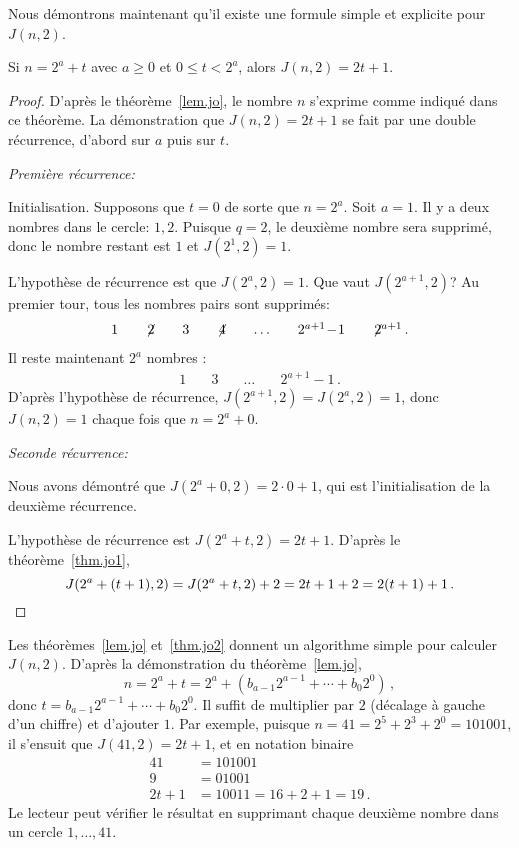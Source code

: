Nous démontrons maintenant qu'il existe une formule simple  et explicite pour $J(n,2)$. 
\begin{theorem}\label{thm.jo2}
Si $n=2^a+t$ avec $a\geq 0$ et $0\leq t < 2^a$, alors $J(n,2)=2t+1$.
\end{theorem}

\begin{proof}
D'après le théorème~\ref{lem.jo}, 
 le nombre $n$ s'exprime comme indiqué dans ce théorème. La démonstration que $J(n,2)=2t+1$ se fait par une double récurrence, d'abord sur $a$ puis sur $t$.

\textit{Première récurrence:}

Initialisation. Supposons que $t=0$ de sorte que $n=2^a$. Soit $a=1$.  Il y a deux nombres dans le cercle: $1,2$. Puisque $q=2$, le deuxième nombre sera supprimé, donc le nombre restant est $1$ et $J(2^1,2)=1$.

L'hypothèse de récurrence est que $J(2^a,2)=1$. Que vaut $J(2^{a+1},2)$? Au premier tour, tous les nombres pairs sont supprimés:
\[
\begin{array}{rrrrrrrrrrrrrrrrrrrrrrrrrrrr}
1&\quad\not\! 2&\quad3&\quad\not\! 4& \quad\ldots&\quad 2^{a+1}\!-\!1&\quad \not\! 2^{a+1}\,.
\end{array}
\]
Il reste maintenant $2^a$ nombres :
\[
\begin{array}{rrrrrrrrrrrrrrrrrrrrrrrrrrrr}
1&\quad3&\quad\ldots&\quad 2^{a+1}\!-\!1\,.
\end{array}
\]
D'après l'hypothèse de récurrence, $J(2^{a+1},2)=J(2^a,2)=1$, donc  $J(n,2)=1$ chaque fois que $n=2^a+0$.

\textit{Seconde récurrence:}

Nous avons démontré que $J(2^a+0,2)=2\cdot 0 +1$, qui est l'initialisation de la deuxième récurrence.

L'hypothèse de récurrence est $J(2^a+t,2)=2t+1$. D'après le théorème~\ref{thm.jo1},
\[
J(2^a+(t+1),2)=J(2^a+t,2)+2=2t+1+2=2(t+1)+1\,.
\qedhere\]
\end{proof}


Les théorèmes~\ref{lem.jo} et~\ref{thm.jo2} donnent un algorithme simple pour calculer $J(n,2)$. D'après la démonstration du théorème~\ref{lem.jo},
\[
n=2^a+t=2^a+(b_{a-1}2^{a-1}+\cdots+b_{0}2^{0})\,,
\]
donc $t=b_{a-1}2^{a-1}+\cdots+b_{0}2^{0}$. Il suffit de multiplier par $2$ (décalage à gauche d'un chiffre) et d'ajouter $1$. Par exemple, puisque $n=41=2^5+2^3+2^0=101001$, il s'ensuit que $J(41,2)=2t+1$, et en notation binaire 
\begin{align*}
41&=101001\\
9&=01001\\
2t+1&=10011=16+2+1=19\,.
\end{align*}
Le lecteur peut vérifier le résultat en supprimant chaque deuxième nombre dans un cercle $1,\ldots,41$.


